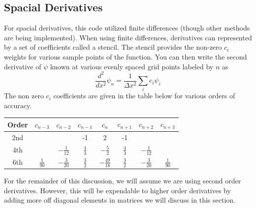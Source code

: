 \documentclass{article}
\begin{document}
\subsection{Spacial Derivatives} %
\label{sub:spacial_derivatives}
For spacial derivatives, this code utilized finite differences (though other methods are being implemented). When using finite differences, derivatives can represented by a set of coefficients called a stencil. The stencil provides the non-zero $c_i$ weights for various sample points of the function. You can then write the second derivative of $\psi$ known at various evenly spaced grid points labeled by $n$ as
\begin{equation}
    \frac{d^2}{dx^2}\psi_n = \frac{1}{\Delta x^2}\sum_i c_i \psi_i
    \label{eq:finite_diff}
\end{equation}
The non zero $c_i$ coefficients are given in the table below for various orders of accuracy.
\begin{center}
\begin{tabular}{ |c|c|c|c|c|c|c|c| }
\hline
Order & $c_{n-3}$ & $c_{n-2}$ & $c_{n-1}$ & $c_{n}$ & $c_{n+1}$ & $c_{n+2}$ & $c_{n+3}$ \\ \hline
2nd   &      &      & -1   & 2  & -1   &      &      \\ \hline
4th   &      & $-\frac{1}{12}$ & $\frac{4}{3}$   & $-\frac{5}{2}$  & $\frac{4}{3}$   &  $-\frac{1}{12}$    &      \\ \hline
6th   &   $\frac{1}{90}$   &  $-\frac{3}{20}$    & $\frac{3}{2}$   & $-\frac{49}{18}$  & $\frac{3}{2}$   &   $-\frac{3}{20}$    &   $\frac{1}{90}$  \\ \hline
\end{tabular}
\end{center}

For the remainder of this discussion, we will assume we are using second order derivatives. However, this will be expendable to higher order derivatives by adding more off diagonal elements in matrices we will discuss in this section.
\end{document}
